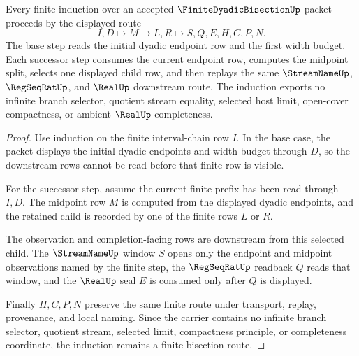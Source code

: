\begin{theorem}
\label{thm:finite-dyadic-bisection-bisection-induction}
Every finite induction over an accepted $\FiniteDyadicBisectionUp$ packet proceeds by the displayed route
$$
I,D \longmapsto M \longmapsto L,R \longmapsto S,Q,E,H,C,P,N .
$$
The base step reads the initial dyadic endpoint row and the first width budget. Each successor step consumes the current endpoint row, computes the midpoint split, selects one displayed child row, and then replays the same $\StreamNameUp$, $\RegSeqRatUp$, and $\RealUp$ downstream route. The induction exports no infinite branch selector, quotient stream equality, selected host limit, open-cover compactness, or ambient $\RealUp$ completeness.
\end{theorem}
\begin{proof}
Use induction on the finite interval-chain row $I$. In the base case, the packet displays the initial dyadic endpoints and width budget through $D$, so the downstream rows cannot be read before that finite row is visible.

For the successor step, assume the current finite prefix has been read through $I,D$. The midpoint row $M$ is computed from the displayed dyadic endpoints, and the retained child is recorded by one of the finite rows $L$ or $R$.

The observation and completion-facing rows are downstream from this selected child. The $\StreamNameUp$ window $S$ opens only the endpoint and midpoint observations named by the finite step, the $\RegSeqRatUp$ readback $Q$ reads that window, and the $\RealUp$ seal $E$ is consumed only after $Q$ is displayed.

Finally $H,C,P,N$ preserve the same finite route under transport, replay, provenance, and local naming. Since the carrier contains no infinite branch selector, quotient stream, selected limit, compactness principle, or completeness coordinate, the induction remains a finite bisection route.
\end{proof}



